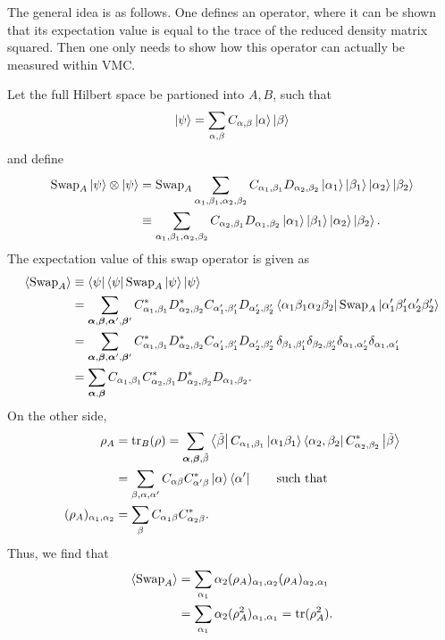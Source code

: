 \documentclass[../../main.tex]{subfiles}
\begin{document}
The general idea is as follows. One defines an operator, where it can be shown that its expectation value is equal to the trace of the reduced density matrix squared. Then one only needs to show how this operator can actually be measured within VMC.

Let the full Hilbert space be partioned into $A, B$, such that 
\begin{equation*}
      \left\lvert \psi \right\rangle = \sum_{\alpha, \beta} C_{\alpha, \beta} \left\lvert \alpha \right\rangle \left\lvert \beta \right\rangle
\end{equation*}
and define
\begin{align}
      \text{Swap}_A \left\lvert \psi \right\rangle \otimes \left\lvert \psi \right\rangle &= \text{Swap}_A \sum_{\alpha_1, \beta_1, \alpha_2, \beta_2} C_{\alpha_1, \beta_1} D_{\alpha_2, \beta_2} \left\lvert \alpha_1 \right\rangle \left\lvert \beta_1 \right\rangle \left\lvert \alpha_2 \right\rangle \left\lvert \beta_2 \right\rangle \notag \\
      &\equiv  \sum_{\alpha_1, \beta_1, \alpha_2, \beta_2} C_{\alpha_2, \beta_1} D_{\alpha_1, \beta_2} \left\lvert \alpha_1 \right\rangle \left\lvert \beta_1 \right\rangle \left\lvert \alpha_2 \right\rangle \left\lvert \beta_2 \right\rangle .
\end{align}
The expectation value of this swap operator is given as
\begin{align*}
      \langle \text{Swap}_A \rangle &\equiv \left\langle \psi \right\rvert  \left\langle \psi \right\rvert \text{Swap}_A \left\lvert \psi \right\rangle  \left\lvert \psi \right\rangle \\
      &= \sum_{\bm \alpha, \bm \beta, \bm \alpha', \bm \beta'} C^*_{\alpha_1, \beta_1} D^*_{\alpha_2, \beta_2} C_{\alpha'_1, \beta'_1} D_{\alpha'_2, \beta'_2}
      \left\langle \alpha_1 \beta_1 \alpha_2 \beta_2 \right\rvert \text{Swap}_A \left\lvert \alpha'_1 \beta'_1 \alpha'_2 \beta'_2 \right\rangle \\
      &= \sum_{\bm \alpha, \bm \beta, \bm \alpha', \bm \beta'} C^*_{\alpha_1, \beta_1} D^*_{\alpha_2, \beta_2} C_{\alpha'_1, \beta'_1} D_{\alpha'_2, \beta'_2} 
      \, \delta_{\beta_1, \beta'_1} \delta_{\beta_2, \beta'_2} \delta_{\alpha_1, \alpha'_2} \delta_{\alpha_1, \alpha'_1}\\
      &= \sum_{\bm \alpha, \bm \beta} C_{\alpha_1, \beta_1} C^*_{\alpha_2, \beta_1} D^*_{\alpha_2, \beta_2}  D_{\alpha_1, \beta_2} .
\end{align*}
On the other side, 
\begin{align*}
      \rho_A &= \operatorname{tr}_B(\rho) = \sum_{\bm \alpha, \bm \beta, \tilde{\beta}} \left\langle \tilde{\beta} \right\rvert 
      C_{\alpha_1, \beta_1} \left\lvert \alpha_1 \beta_1 \right\rangle \left\langle \alpha_2, \beta_2 \right\rvert C^*_{\alpha_2, \beta_2} \left\lvert \tilde{\beta} \right\rangle \\
      &= \sum_{\beta, \alpha, \alpha'} C_{\alpha \beta} C^*_{\alpha' \beta} \left\lvert \alpha \right\rangle\left\langle \alpha' \right\rvert \qquad \text{such that} \\
      (\rho_A)_{\alpha_1, \alpha_2} &= \sum_\beta C_{\alpha_1 \beta} C^*_{\alpha_2 \beta}.
\end{align*}
Thus, we find that 
\begin{align}
      \langle \text{Swap}_A \rangle &= 
      \sum_{\alpha_1} \alpha_2 (\rho_A)_{\alpha_1, \alpha_2} (\rho_A)_{\alpha_2, \alpha_1} \notag \\
      &= \sum_{\alpha_1} \alpha_2 (\rho^2_A)_{\alpha_1, \alpha_1} = \operatorname{tr}(\rho_A^2) .
\end{align}
\end{document}
